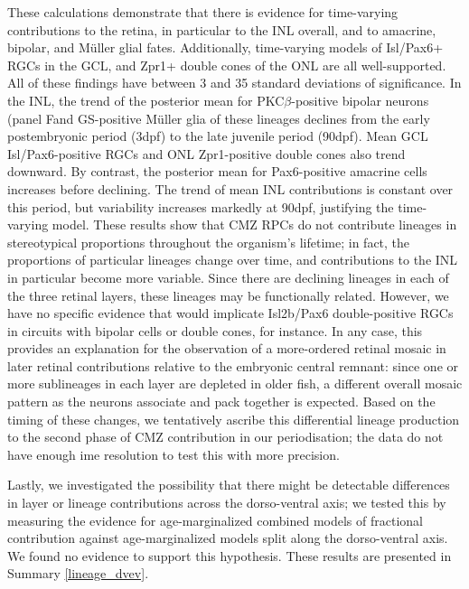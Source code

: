 These calculations demonstrate that there is evidence for time-varying contributions to the retina, in particular to the INL overall, and to amacrine, bipolar, and M{\"u}ller glial fates.  Additionally, time-varying models of Isl/Pax6+ RGCs in the GCL, and Zpr1+ double cones of the ONL are all well-supported. All of these findings have between 3 and 35 standard deviations of significance. In the INL, the trend of the posterior mean for PKC$\beta$-positive bipolar neurons (panel Fand GS-positive M{\"u}ller glia of these lineages declines from the early postembryonic period (3dpf) to the late juvenile period (90dpf). Mean GCL Isl/Pax6-positive RGCs and ONL Zpr1-positive double cones also trend downward. By contrast, the posterior mean for Pax6-positive amacrine cells increases before declining. The trend of mean INL contributions is constant over this period, but variability increases markedly at 90dpf, justifying the time-varying model. These results show that CMZ RPCs do not contribute lineages in stereotypical proportions throughout the organism's lifetime; in fact, the proportions of particular lineages change over time, and contributions to the INL in particular become more variable. Since there are declining lineages in each of the three retinal layers, these lineages may be functionally related. However, we have no specific evidence that would implicate Isl2b/Pax6 double-positive RGCs in circuits with bipolar cells or double cones, for instance. In any case, this provides an explanation for the observation of a more-ordered retinal mosaic in later retinal contributions relative to the embryonic central remnant: since one or more sublineages in each layer are depleted in older fish, a different overall mosaic pattern as the neurons associate and pack together is expected. Based on the timing of these changes, we tentatively ascribe this differential lineage production to the second phase of CMZ contribution in our periodisation; the data do not have enough ime resolution to test this with more precision.

Lastly, we investigated the possibility that there might be detectable differences in layer or lineage contributions across the dorso-ventral axis; we tested this by measuring the evidence for age-marginalized combined models of fractional contribution against age-marginalized models split along the dorso-ventral axis. We found no evidence to support this hypothesis. These results are presented in Summary \autoref{lineage_dvev}.

\FloatBarrier

